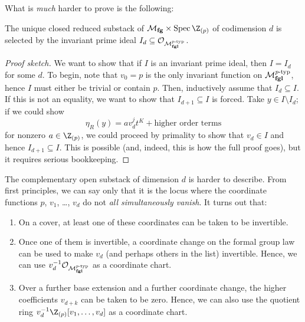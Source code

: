 \noindent What is \emph{much} harder to prove is the following:

\begin{theorem}\label{LandwebersClassificationOfClosedSubstacks}
The unique closed reduced substack of \(\moduli{fg} \times \Spec \Z_{(p)}\) of codimension \(d\) is selected by the invariant prime ideal \(I_d \subseteq \mathcal{O}_{\mathcal{M}_{\mathbf{fgl}}^{\mathit{p}\text{-}\mathrm{typ}}}\).
\end{theorem}
\begin{proof}[Proof sketch]
We want to show that if \(I\) is an invariant prime ideal, then \(I = I_d\) for some \(d\).  To begin, note that \(v_0 = p\) is the only invariant function on \(\mathcal{M}_{\mathbf{fgl}}^{\mathit{p}\text{-}\mathrm{typ}}\), hence \(I\) must either be trivial or contain \(p\).  Then, inductively assume that \(I_d \subseteq I\).  If this is not an equality, we want to show that \(I_{d+1} \subseteq I\) is forced.  Take \(y \in I \setminus I_d\); if we could show \[\eta_R(y) = a v_d^j t^K + \text{higher order terms}\] for nonzero \(a \in \Z_{(p)}\), we could proceed by primality to show that \(v_d \in I\) and hence \(I_{d+1} \subseteq I\).  This is possible (and, indeed, this is how the full proof goes), but it requires serious bookkeeping.
\end{proof}

\begin{remark}\label{OpenSubstacksOfMfg}
The complementary open substack of dimension \(d\) is harder to describe. %
From first principles, we can say only that it is the locus where the coordinate functions \(p\), \(v_1\), \ldots, \(v_d\) do not \emph{all simultaneously vanish}.  It turns out that:
\begin{enumerate}
\item On a cover, at least one of these coordinates can be taken to be invertible.\item Once one of them is invertible, a coordinate change on the formal group law can be used to make \(v_d\) (and perhaps others in the list) invertible.  Hence, we can use \(v_d^{-1} \mathcal{O}_{\mathcal{M}_{\mathbf{fgl}}^{\mathit{p}\text{-}\mathrm{typ}}}\) as a coordinate chart.
\item Over a further base extension and a further coordinate change, the higher coefficients \(v_{d+k}\) can be taken to be zero.  Hence, we can also use the quotient ring \(v_d^{-1} \Z_{(p)}[v_1, \ldots, v_d]\) as a coordinate chart.
\end{enumerate}
\end{remark}

